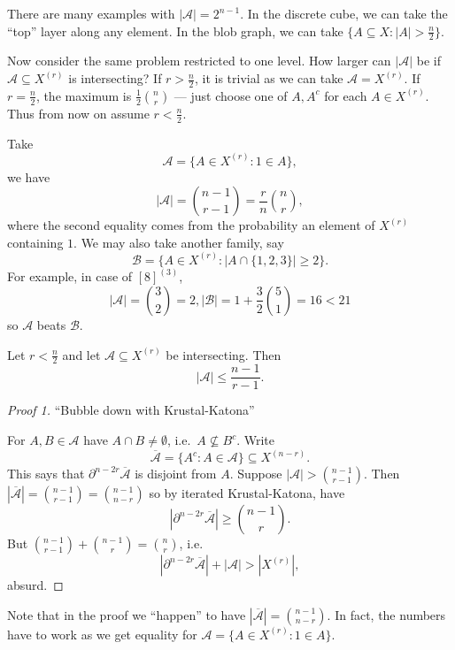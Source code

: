 \documentclass[a4paper]{article}
\newcommand{\shadow}{\partial}
\begin{document}
\begin{note}
  There are many examples with \(|\mathcal A| = 2^{n - 1}\). In the discrete cube, we can take the ``top'' layer along any element. In the blob graph, we can take \(\{A \subseteq X: |A| > \frac{n}{2}\}\).
\end{note}

Now consider the same problem restricted to one level. How larger can \(|\mathcal A|\) be if \(\mathcal A \subseteq X^{(r)}\) is intersecting? If \(r > \frac{n}{2}\), it is trivial as we can take \(\mathcal A = X^{(r)}\). If \(r = \frac{n}{2}\), the maximum is \(\frac{1}{2} \binom{n}{r}\) --- just choose one of \(A, A^c\) for each \(A \in X^{(r)}\). Thus from now on assume \(r < \frac{n}{2}\).

Take
\[
  \mathcal A = \{A \in X^{(r)}: 1 \in A\},
\]
we have
\[
  |\mathcal A| = \binom{n - 1}{r - 1} = \frac{r}{n} \binom{n}{r},
\]
where the second equality comes from the probability an element of \(X^{(r)}\) containing \(1\). We may also take another family, say
\[
  \mathcal B = \{A \in X^{(r)}: |A \cap \{1, 2, 3\}| \geq 2\}.
\]
For example, in case of \([8]^{(3)}\),
\[
  |\mathcal A| = \binom{3}{2} = 2, |\mathcal B| = 1 + \frac{3}{2} \binom{5}{1} = 16 < 21
\]
so \(\mathcal A\) beats \(\mathcal B\).

\begin{theorem}
  Let \(r < \frac{n}{2}\) and let \(\mathcal A \subseteq X^{(r)}\) be intersecting. Then
  \[
    |\mathcal A| \leq \frac{n - 1}{r - 1}.
  \]
\end{theorem}

\begin{proof}[Proof 1]
  ``Bubble down with Krustal-Katona''

  For \(A, B \in \mathcal A\) have \(A \cap B \neq \emptyset\), i.e.\ \(A \nsubseteq B^c\). Write
  \[
    \overline{\mathcal A} = \{A^c: A \in \mathcal A\} \subseteq X^{(n - r)}.
  \]
  This says that \(\shadow^{n - 2r}\overline{\mathcal A}\) is disjoint from \(A\). Suppose \(|\mathcal A| > \binom{n - 1}{r - 1}\). Then \(|\overline{\mathcal A}| = \binom{n - 1}{r - 1} = \binom{n - 1}{n - r}\) so by iterated Krustal-Katona, have
  \[
    |\shadow^{n - 2r} \overline{\mathcal A}| \geq \binom{n - 1}{r}.
  \]
  But \(\binom{n - 1}{r - 1} + \binom{n - 1}{r} = \binom{n}{r}\), i.e.
  \[
    |\shadow^{n - 2r} \overline{\mathcal A}| + |\mathcal A| > |X^{(r)}|,
  \]
  absurd.
\end{proof}

\begin{remark}
  Note that in the proof we ``happen'' to have \(|\overline{\mathcal A}| = \binom{n - 1}{n - r}\). In fact, the numbers have to work as we get equality for \(\mathcal A = \{A \in X^{(r)}: 1 \in A\}\).
\end{remark}
\end{document}

